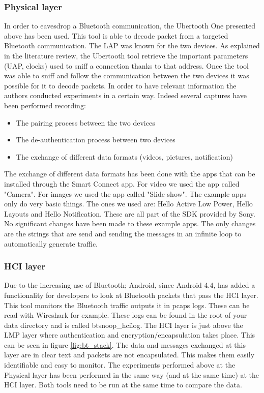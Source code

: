 \subsubsection{Physical layer}
In order to eavesdrop a Bluetooth communication, the Ubertooth One presented above has been used. This tool is able to decode packet from a targeted Bluetooth communication. \pend
The LAP was known for the two devices. As explained in the literature review, the Ubertooth tool retrieve the important parameters (UAP, clocks) used to sniff a connection thanks to that address. Once the tool was able to sniff and follow the communication between the two devices it was possible for it to decode packets.
In order to have relevant information the authors conducted experiments in a certain way. Indeed several captures have been performed recording:
\begin{itemize}
	\item The pairing process between the two devices
	\item The de-authentication process between two devices
	\item The exchange of different data formats (videos, pictures, notification) 
\end{itemize}
The exchange of different data formats has been done with the apps that can be installed through the Smart Connect app. For video we used the app called "Camera". For images we used the app called "Slide show". \pend The example apps only do very basic things. The ones we used are: Hello Active Low Power, Hello Layouts and Hello Notification. These are all part of the SDK provided by Sony.
No significant changes have been made to these example apps. The only changes are the strings that are send and sending the messages in an infinite loop to automatically generate traffic.

\subsubsection{HCI layer}
Due to the increasing use of Bluetooth; Android, since Android 4.4, has added a functionality for developers to look at Bluetooth packets that pass the HCI layer. This tool monitors the Bluetooth traffic outputs it in pcaps logs. These can be read with Wireshark for example. These logs can be found in the root of your data directory and is called btsnoop\_hci\.log.\pend
The HCI layer is just above the LMP layer where authentication and encryption/encapsulation takes place. This can be seen in figure \ref{fig:bt_stack}. The data and messages exchanged at this layer are in clear text and packets are not encapsulated. This makes them easily identifiable and easy to monitor. \pend
The experiments performed above at the Physical layer has been performed in the same way (and at the same time) at the HCI layer. Both tools need to be run at the same time to compare the data.